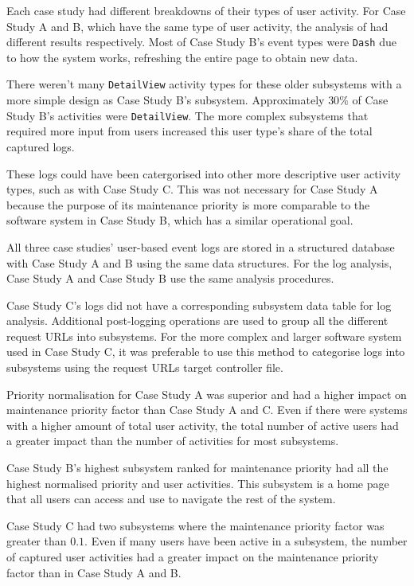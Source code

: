 Each case study had different breakdowns of their types of user activity. For Case Study A and B, which have the same type of user activity, the analysis of  had different results respectively. Most of Case Study B's event types were \texttt{Dash} due to how the system works, refreshing the entire page to obtain new data. \par There weren't many \texttt{DetailView} activity types for these older subsystems with a more simple design as Case Study B's subsystem. Approximately $30\%$ of Case Study B's activities were \texttt{DetailView}. The more complex subsystems that required more input from users increased this user type's share of the total captured logs. \par These logs could have been catergorised into other more descriptive user activity types, such as with Case Study C. This was not necessary for Case Study A because the purpose of its maintenance priority is more comparable to the software system in Case Study B, which has a similar operational goal. \par All three case studies' user-based event logs are stored in a structured database with Case Study A and B using the same data structures. For the log analysis, Case Study A and Case Study B use the same analysis procedures. \par Case Study C's logs did not have a corresponding subsystem data table for log analysis. Additional post-logging operations are used to group all the different request URLs into subsystems. For the more complex and larger software system used in Case Study C, it was preferable to use this method to categorise logs into subsystems using the request URLs target controller file. \par Priority normalisation for Case Study A was superior and had a higher impact on maintenance priority factor than Case Study A and C. Even if there were systems with a higher amount of total user activity, the total number of active users had a greater impact than the number of activities for most subsystems. \par Case Study B's highest subsystem ranked for maintenance priority had all the highest normalised priority and user activities. This subsystem is a home page that all users can access and use to navigate the rest of the system. \par Case Study C had two subsystems where the maintenance priority factor was greater than $0.1$. Even if many users have been active in a subsystem, the number of captured user activities had a greater impact on the maintenance priority factor than in Case Study A and B.

